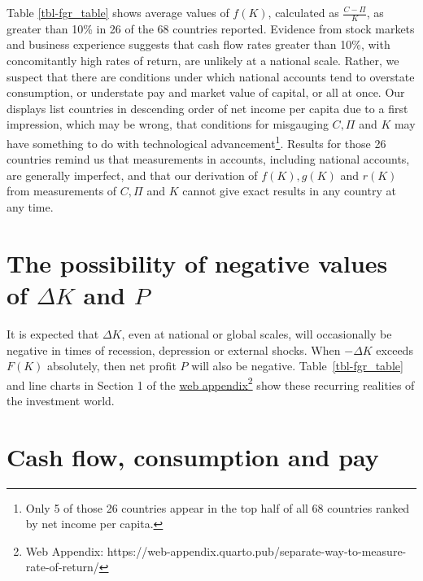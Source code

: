 \documentclass[a4paper,fleqn]{cas-sc}
\begin{document}
Table \ref{tbl-fgr_table} shows average values of \(f(K)\), calculated as \(\frac{C-\Pi}{K}\), as greater than 10\% in 26 of the 68 countries reported. 
Evidence from stock markets and business experience suggests that cash flow rates greater than 10\%, with concomitantly high rates of return, are unlikely at a national scale. Rather, we suspect that there are conditions under which national accounts tend to overstate consumption, or understate pay and market value of capital, or all at once. Our displays list countries in descending order of net income per capita due to a first impression, which may be wrong, that conditions for misgauging \(C, \Pi\) and \(K\) may have something to do with technological advancement\footnote{Only 5 of those 26 countries appear in the top half of all 68 countries ranked by net income per capita.}. Results for those 26 countries remind us that measurements in accounts, including national accounts, are generally imperfect, and that our derivation of \(f(K), g(K)\) and \(r(K)\) from measurements of \(C, \Pi\) and \(K\) cannot give exact results in any country at any time.




\section{The possibility of negative values of $\Delta K$ and $P$}

It is expected that \(\Delta K\), even at national or global scales, will occasionally be negative in times of recession, depression or external shocks. When \(- \Delta K\) exceeds \(F(K)\) absolutely, then net profit $P$ will also be negative. Table~\ref{tbl-fgr_table} and line charts in Section 1 of the \href{https://web-appendix.quarto.pub/separate-way-to-measure-rate-of-return/}{web appendix}\footnote{Web Appendix: https://web-appendix.quarto.pub/separate-way-to-measure-rate-of-return/} show these recurring realities of the investment world.


\section{Cash flow, consumption and pay}
\end{document}
